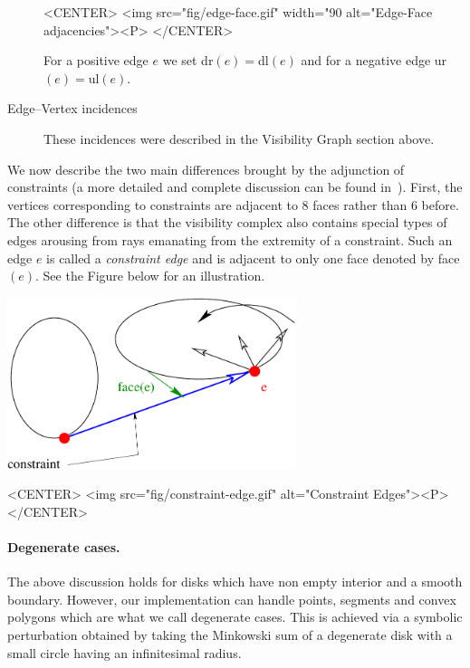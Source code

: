\begin{description}
    \begin{ccHtmlOnly}
        <CENTER>
            <img src="fig/edge-face.gif" width="90%
             alt="Edge-Face adjacencies"><P>
        </CENTER>
    \end{ccHtmlOnly}
    For a positive edge $e$ we set dr$(e) = $dl$(e)$ and for a negative edge
    ur$(e) = $ul$(e)$.
    \item[{Edge--Vertex incidences}]These incidences were described in
    the Visibility Graph section above.
\end{description}

We now describe the two main differences brought by the adjunction of
constraints (a more detailed and complete discussion can be found
in~\cite{ap-sstvc-01}).  First, the vertices corresponding to constraints are
adjacent to $8$ faces rather than $6$ before. The other difference is that the
visibility complex also contains special types of edges arousing from rays
emanating from the extremity of a constraint. Such an edge $e$ is called a
\emph{constraint edge} and is adjacent to only one face denoted by face$(e)$.
See the Figure below for an illustration.
\begin{ccTexOnly}
    \begin{center}
        \includegraphics[height=5cm]{Visibility_complex/fig/constraint-edge}%
    \end{center}
\end{ccTexOnly}

\begin{ccHtmlOnly}
    <CENTER>
        <img src="fig/constraint-edge.gif" alt="Constraint Edges"><P>
    </CENTER>
\end{ccHtmlOnly}

\paragraph{Degenerate cases.} The above discussion holds for disks which have
non empty interior and a smooth boundary. However, our implementation can
handle points, segments and convex polygons which are what we call
degenerate cases.  This is achieved via a symbolic perturbation obtained by
taking the Minkowski sum of a degenerate disk with a small circle having an
infinitesimal radius.

